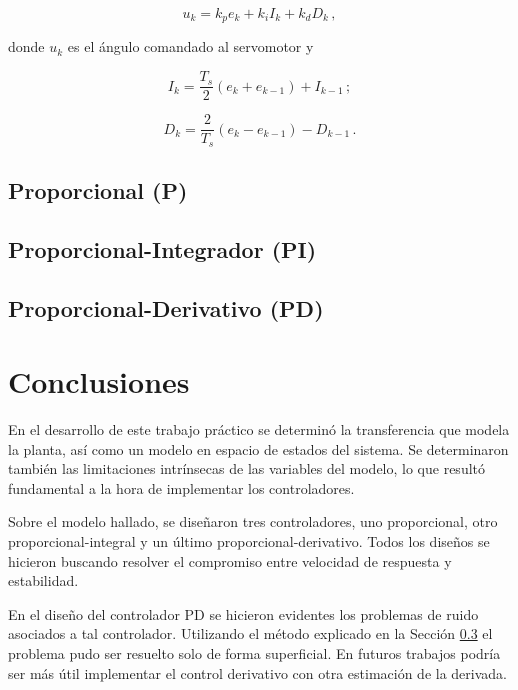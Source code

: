 \documentclass[a4paper,12pt]{article}
\begin{document}
\begin{equation}
  u_k = k_p e_k + k_i I_k + k_d D_k\,,
  \label{eq:PID discreto}
\end{equation}

donde $u_k$ es el ángulo comandado al servomotor y 

\begin{equation}
  I_k = \frac{T_s}{2}(e_k + e_{k-1}) + I_{k-1}\,;
  \label{eq:integral discreta}
\end{equation}


\begin{equation}
  D_k = \frac{2}{T_s}(e_k - e_{k-1}) - D_{k-1}\,.
  \label{eq:derivada discreta}
\end{equation}

\subsection{Proporcional (P)}



\subsection{Proporcional-Integrador (PI)}



\subsection{Proporcional-Derivativo (PD)}

\label{sec:PD}


\section{Conclusiones}

En el desarrollo de este trabajo práctico se determinó la transferencia que modela la planta, así como un modelo en espacio de estados del sistema. Se determinaron también las limitaciones intrínsecas de las variables del modelo, lo que resultó fundamental a la hora de implementar los controladores.

Sobre el modelo hallado, se diseñaron tres controladores, uno proporcional, otro proporcional-integral y un último proporcional-derivativo. Todos los diseños se hicieron buscando resolver el compromiso entre velocidad de respuesta y estabilidad.

En el diseño del controlador PD se hicieron evidentes los problemas de ruido asociados a tal controlador. Utilizando el método explicado en la Sección \ref{sec:PD} el problema pudo ser resuelto solo de forma superficial. En futuros trabajos podría ser más útil implementar el control derivativo con otra estimación de la derivada. 
\end{document}
